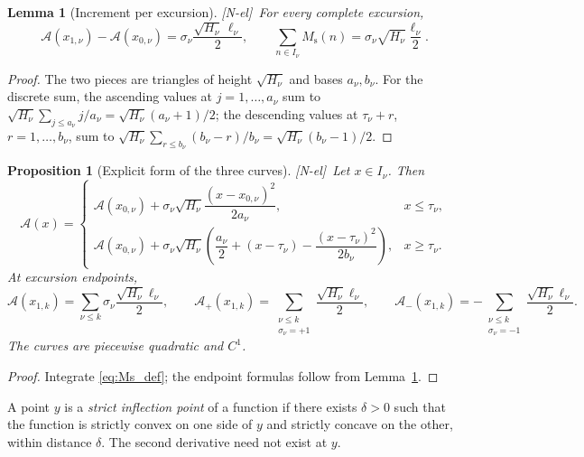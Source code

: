 \documentclass[11pt]{amsart}
\numberwithin{equation}{section}
\theoremstyle{plain}
\newtheorem{proposition}[theorem]{Proposition}
\newtheorem{lemma}[theorem]{Lemma}
\theoremstyle{definition}
\theoremstyle{remark}
\newcommand{\Ms}{M_{\mathrm{s}}}
\newcommand{\Ap}{\mathcal{A}_{+}}
\newcommand{\Am}{\mathcal{A}_{-}}
\newcommand{\Anet}{\mathcal{A}}
\newcommand{\tagNE}{\textup{[N-el]}}
\begin{document}
\begin{lemma}[Increment per excursion]
\label{lem:jump}
\tagNE\ For every complete excursion,
\begin{equation}
\label{eq:jump}
\Anet(x_{1,\nu})-\Anet(x_{0,\nu})
=\sigma_\nu\frac{\sqrt{H_\nu}\,\ell_\nu}{2},
\qquad
\sum_{n\in I_\nu}\Ms(n)
=\sigma_\nu\sqrt{H_\nu}\frac{\ell_\nu}{2}.
\end{equation}
\end{lemma}

\begin{proof}
The two pieces are triangles of height $\sqrt{H_\nu}$ and bases $a_\nu,b_\nu$.
For the discrete sum, the ascending values at $j=1,\ldots,a_\nu$ sum to
$\sqrt{H_\nu}\sum_{j\le a_\nu}j/a_\nu=\sqrt{H_\nu}(a_\nu+1)/2$; the
descending values at $\tau_\nu+r$, $r=1,\ldots,b_\nu$, sum to
$\sqrt{H_\nu}\sum_{r\le b_\nu}(b_\nu-r)/b_\nu=\sqrt{H_\nu}(b_\nu-1)/2$.
\end{proof}

\begin{proposition}[Explicit form of the three curves]
\label{prop:explicit}
\tagNE\ Let $x\in I_\nu$. Then
\begin{equation}
\label{eq:explicit_A}
\Anet(x)=
\begin{cases}
\Anet(x_{0,\nu})+\sigma_\nu\sqrt{H_\nu}
\dfrac{(x-x_{0,\nu})^2}{2a_\nu},&x\le\tau_\nu,\\[2ex]
\Anet(x_{0,\nu})+\sigma_\nu\sqrt{H_\nu}
\left(\dfrac{a_\nu}{2}+(x-\tau_\nu)-
\dfrac{(x-\tau_\nu)^2}{2b_\nu}\right),&x\ge\tau_\nu.
\end{cases}
\end{equation}
At excursion endpoints,
\begin{equation}
\label{eq:explicit_net}
\Anet(x_{1,k})=\sum_{\nu\le k}\sigma_\nu\frac{\sqrt{H_\nu}\ell_\nu}{2},\qquad
\Ap(x_{1,k})=\sum_{\substack{\nu\le k\\\sigma_\nu=+1}}
\frac{\sqrt{H_\nu}\ell_\nu}{2},\qquad
\Am(x_{1,k})=-\sum_{\substack{\nu\le k\\\sigma_\nu=-1}}
\frac{\sqrt{H_\nu}\ell_\nu}{2}.
\end{equation}
The curves are piecewise quadratic and $C^1$.
\end{proposition}

\begin{proof}
Integrate \eqref{eq:Ms_def}; the endpoint formulas follow from
Lemma~\ref{lem:jump}.
\end{proof}

A point $y$ is a \emph{strict inflection point} of a function if there
exists $\delta>0$ such that the function is strictly convex on one side of
$y$ and strictly concave on the other, within distance $\delta$. The second
derivative need not exist at $y$.
\end{document}
